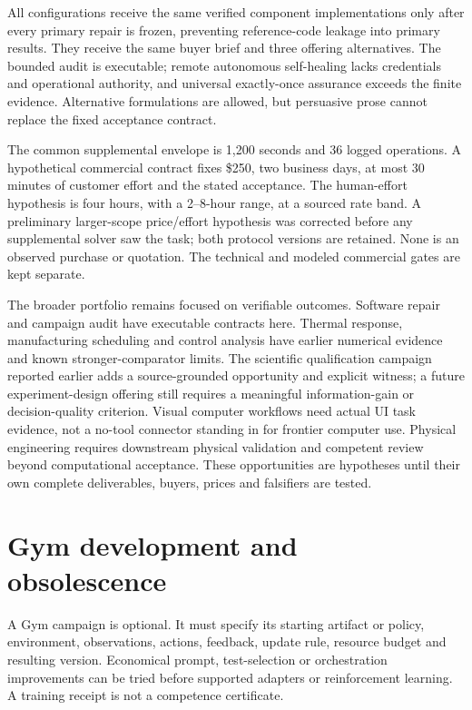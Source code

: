 \documentclass[11pt,letterpaper]{article}
\begin{document}
All configurations receive the same verified component implementations only after every primary repair is frozen, preventing reference-code leakage into primary results. They receive the same buyer brief and three offering alternatives. The bounded audit is executable; remote autonomous self-healing lacks credentials and operational authority, and universal exactly-once assurance exceeds the finite evidence. Alternative formulations are allowed, but persuasive prose cannot replace the fixed acceptance contract.

The common supplemental envelope is 1,200 seconds and 36 logged operations. A hypothetical commercial contract fixes \$250, two business days, at most 30 minutes of customer effort and the stated acceptance. The human-effort hypothesis is four hours, with a 2--8-hour range, at a sourced rate band. A preliminary larger-scope price/effort hypothesis was corrected before any supplemental solver saw the task; both protocol versions are retained. None is an observed purchase or quotation. The technical and modeled commercial gates are kept separate.



The broader portfolio remains focused on verifiable outcomes. Software repair and campaign audit have executable contracts here. Thermal response, manufacturing scheduling and control analysis have earlier numerical evidence and known stronger-comparator limits. The scientific qualification campaign reported earlier adds a source-grounded opportunity and explicit witness; a future experiment-design offering still requires a meaningful information-gain or decision-quality criterion. Visual computer workflows need actual UI task evidence, not a no-tool connector standing in for frontier computer use. Physical engineering requires downstream physical validation and competent review beyond computational acceptance. These opportunities are hypotheses until their own complete deliverables, buyers, prices and falsifiers are tested.

\section{Gym development and obsolescence}
A Gym campaign is optional. It must specify its starting artifact or policy, environment, observations, actions, feedback, update rule, resource budget and resulting version. Economical prompt, test-selection or orchestration improvements can be tried before supported adapters or reinforcement learning. A training receipt is not a competence certificate.
\end{document}
